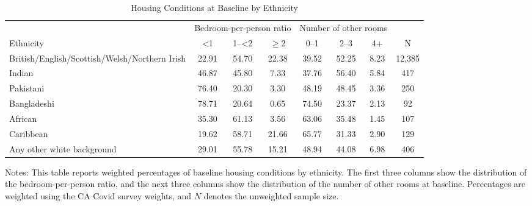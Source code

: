 \begin{table}[htbp]
\centering
\caption{Housing Conditions at Baseline by Ethnicity}
\label{tab:ethnicity_housing}
\begin{threeparttable}
\footnotesize
\begin{tabular*}{\textwidth}{@{\extracolsep{\fill}}p{5.4cm}ccccccc}
\toprule
& \multicolumn{3}{c}{Bedroom-per-person ratio} & \multicolumn{3}{c}{Number of other rooms} & \\
\cmidrule(lr){2-4}\cmidrule(lr){5-7}
Ethnicity & <1 & 1--<2 & $\geq$2 & 0--1 & 2--3 & 4+ & N \\
\midrule
British/English/Scottish/Welsh/Northern Irish & 22.91 & 54.70 & 22.38 & 39.52 & 52.25 & 8.23 & 12,385 \\
Indian & 46.87 & 45.80 & 7.33 & 37.76 & 56.40 & 5.84 & 417 \\
Pakistani & 76.40 & 20.30 & 3.30 & 48.19 & 48.45 & 3.36 & 250 \\
Bangladeshi & 78.71 & 20.64 & 0.65 & 74.50 & 23.37 & 2.13 & 92 \\
African & 35.30 & 61.13 & 3.56 & 63.06 & 35.48 & 1.45 & 107 \\
Caribbean & 19.62 & 58.71 & 21.66 & 65.77 & 31.33 & 2.90 & 129 \\
Any other white background & 29.01 & 55.78 & 15.21 & 48.94 & 44.08 & 6.98 & 406 \\
\bottomrule
\end{tabular*}
\begin{tablenotes}[flushleft]
\footnotesize
\item Notes: This table reports weighted percentages of baseline housing conditions by ethnicity. The first three columns show the distribution of the bedroom-per-person ratio, and the next three columns show the distribution of the number of other rooms at baseline. Percentages are weighted using the CA Covid survey weights, and \(N\) denotes the unweighted sample size.
\end{tablenotes}
\end{threeparttable}
\end{table}